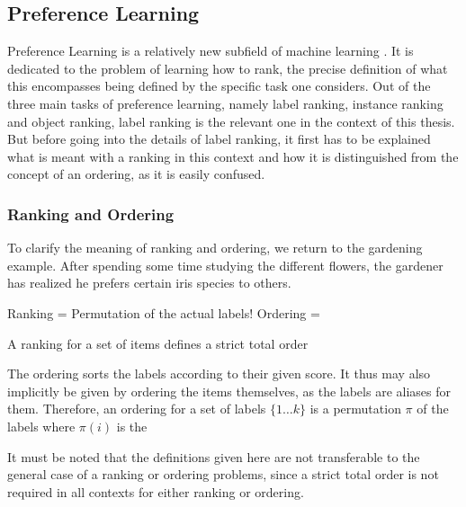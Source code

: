 \subsection{Preference Learning}
Preference Learning is a relatively new subfield of machine learning \cite{DBLP:books/daglib/0025729}. It is dedicated to the problem of learning how to rank, the precise definition of what this encompasses being defined by the specific task one considers. Out of the three main tasks of preference learning, namely label ranking, instance ranking and object ranking, label ranking is the relevant one in the context of this thesis. But before going into the details of label ranking, it first has to be explained what is meant with a ranking in this context and how it is distinguished from the concept of an ordering, as it is easily confused.

\subsubsection{Ranking and Ordering}
To clarify the meaning of ranking and ordering, we return to the gardening example. After spending some time studying the different flowers, the gardener has realized he prefers certain iris species to others. 

Ranking = Permutation of the actual labels!
Ordering =

A ranking for a set of items defines a strict total order 

The ordering sorts the labels according to their given score. It thus may also implicitly be given by ordering the items themselves, as the labels are aliases for them. Therefore, an ordering for a set of labels $\lbrace 1\dots k\rbrace$ is a permutation $\pi$ of the labels where $\pi(i)$ is the 

It must be noted that the definitions given here are not transferable to the general case of a ranking or ordering problems, since a strict total order is not required in all contexts for either ranking or ordering.

